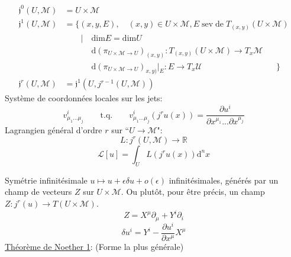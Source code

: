 \documentclass[a4paper,11pt]{article}
\renewcommand{\d}{{\mathrm{d}}}
\newcommand{\dr}[2]{\frac{\partial {#1}}{\partial{#2}}}
\begin{document}
\begin{align*}
	\mathfrak{j}^0(U,\mathcal{M}) &= U\times\mathcal{M}\\
	\mathfrak{j}^1(U,\mathcal{M}) &= \{(x,y,E), \quad (x,y)\in U\times\mathcal{M}, E \;\mathrm{sev}\;\mathrm{de}\; T_{(x,y)}(U\times\mathcal{M})\\&\quad \quad| \quad \mathrm{dim}E=\mathrm{dim}U\\
	&\quad\quad\quad\;\d (\pi_{U\times\mathcal{M}\to U})_{(x,y)}: T_{(x,y)}(U\times\mathcal{M})\to T_x\mathcal{M}
	\\&\quad\quad\quad\; \d (\pi_{U\times\mathcal{M}\to U})_{x,y)}|_E : E\to T_x\mathcal{U}\quad\quad\quad\quad\quad\quad\quad\quad\quad\}\\
	\mathfrak{j}^r(U,\mathcal{M}) &= \mathfrak{j}^1(U, j^{r-1}(U,\mathcal{M}))
\end{align*}
Système de coordonnées locales sur les jets:
$$v^i_{\mu_1...\mu_j} \quad\quad \mathrm{t}.\mathrm{q}. \quad\quad v^i_{\mu_1...\mu_j}(j^ru(x))=\dr{u^i}{x^{\mu_1}...\partial x^{\mu_j}}$$
Lagrangien général d'ordre $r$ sur ``$U\to\mathcal{M}$":
$$L : j^r(U,\mathcal{M}) \to \mathbb{R}$$
$$\mathcal{L}[u] = \int_{U} L(j^r u(x))\d^n x$$

Symétrie infinitésimale $u\mapsto u+\epsilon\delta u + o(\epsilon)$ infinitésimales, générés par un champ de vecteurs $Z$ sur $U\times\mathcal{M}$. Ou plutôt, pour être précis, un champ $Z:j^r(u)\to T(U\times\mathcal{M})$.
$$Z = X^\mu \partial_\mu + Y^i  \partial_i$$
$$\delta u^i = Y^i - \dr{u^i}{x^\mu}X^\mu$$
\underline{Théorème de Noether 1}: (Forme la plus générale)
\end{document}
